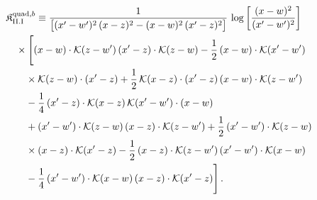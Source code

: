 \begin{align}\label{eq:K-rm_quad_b_rm_II_I}
&\mathfrak{K}^{{\rm quad},b}_{\rm II.I}\equiv \frac{1}{\big[(x'-w')^{2}\,(x-z)^{2}-(x-w)^{2}\,(x'-z)^{2}\big]}\, \log\left[\frac{(x-w)^{2}}{(x'-w')^{2}}\right]\notag\\
&\quad \times\Bigg[(x-w)\cdot\mathcal{K}(z-w')\, (x'-z)\cdot\mathcal{K}(z-w) -\frac{1}{2}\, (x-w)\cdot\mathcal{K}(x'-w')\notag\\
&\quad\quad \times \mathcal{K}(z-w)\cdot(x'-z) +\frac{1}{2}\, \mathcal{K}(x-z)\cdot(x'-z)\, (x-w)\cdot\mathcal{K}(z-w')\notag\\
&\quad\quad -\frac{1}{4}\, (x'-z)\cdot\mathcal{K}(x-z)\, \mathcal{K}(x'-w')\cdot(x-w)\notag\\
&\quad\quad +(x'-w')\cdot\mathcal{K}(z-w)\, (x-z)\cdot\mathcal{K}(z-w') +\frac{1}{2}\, (x'-w')\cdot\mathcal{K}(z-w)\notag\\
&\quad\quad \times (x-z)\cdot\mathcal{K}(x'-z) -\frac{1}{2}\, (x-z)\cdot\mathcal{K}(z-w')\, (x'-w')\cdot\mathcal{K}(x-w)\notag\\
&\quad\quad -\frac{1}{4}\, (x'-w')\cdot\mathcal{K}(x-w)\, (x-z)\cdot\mathcal{K}(x'-z)\Bigg]\,.
\end{align}
